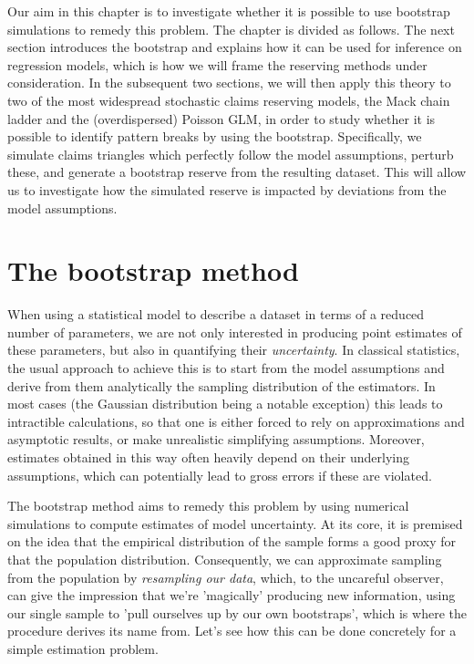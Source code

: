\documentclass[a4paper]{book}
\begin{document}
Our aim in this chapter is to investigate whether it is possible to use bootstrap simulations to remedy this problem. The chapter is divided as follows. The next section introduces the bootstrap and explains how it can be used for inference on regression models, which is how we will frame the reserving methods under consideration. In the subsequent two sections, we will then apply this theory to two of the most widespread stochastic claims reserving models, the Mack chain ladder and the (overdispersed) Poisson GLM, in order to study whether it is possible to identify pattern breaks by using the bootstrap. Specifically, we simulate claims triangles which perfectly follow the model assumptions, perturb these, and generate a bootstrap reserve from the resulting dataset. This will allow us to investigate how the simulated reserve is impacted by deviations from the model assumptions.

\chapter{The bootstrap method} \label{chapter:boot}

When using a statistical model to describe a dataset in terms of a reduced number of parameters, we are not only interested in producing point estimates of these parameters, but also in quantifying their \emph{uncertainty}. In classical statistics, the usual approach to achieve this is to start from the model assumptions and derive from them analytically the sampling distribution of the estimators. In most cases (the Gaussian distribution being a notable exception) this leads to intractible calculations, so that one is either forced to rely on approximations and asymptotic results, or make unrealistic simplifying assumptions. Moreover, estimates obtained in this way often heavily depend on their underlying assumptions, which can potentially lead to gross errors if these are violated.

The bootstrap method aims to remedy this problem by using numerical simulations to compute estimates of model uncertainty. At its core, it is premised on the idea that the empirical distribution of the sample forms a good proxy for that the population distribution. Consequently, we can approximate sampling from the population by \emph{resampling our data}, which, to the uncareful observer, can give the impression that we're 'magically' producing new information, using our single sample to 'pull ourselves up by our own bootstraps', which is where the procedure derives its name from. Let's see how this can be done concretely for a simple estimation problem.
\end{document}
